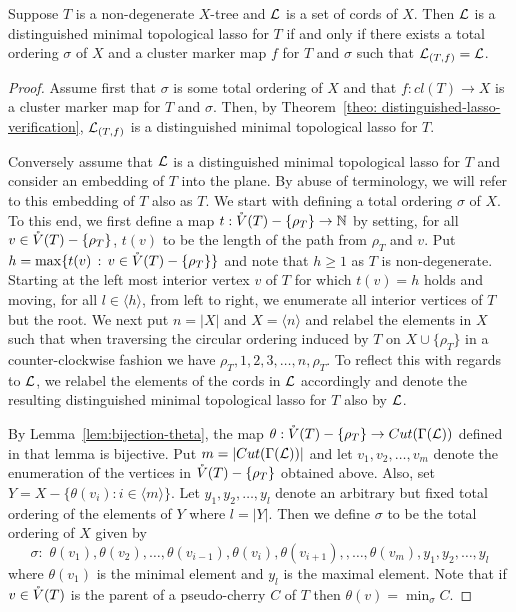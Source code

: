\begin{thm}\label{theo:characterization}
Suppose $T$ is a non-degenerate $X$-tree 
and ${\mathcal L}$ is a set of cords of $X$. Then 
${\mathcal L}$ is a distinguished minimal topological lasso
for $T$ if and only if there exists a total ordering $\sigma$ of $X$ and
a cluster marker map $f$ for $T$ and $\sigma$ 
such that ${\mathcal L}_{(T,f)}={\mathcal L}$.
\end{thm}
 \begin{proof}
Assume first that $\sigma$ is some total ordering of $X$ and that 
$f:cl(T)\to X$ is a cluster marker map for  $T$ and $\sigma$. Then, by
Theorem~\ref{theo: distinguished-lasso-verification}, ${\mathcal L}_{(T,f)}$
is a distinguished minimal topological lasso for $T$.

Conversely assume that ${\mathcal L}$ is a distinguished minimal topological lasso
for $T$ and consider an embedding of $T$ into the plane. 
By abuse of terminology,  we will refer to this embedding of $T$ also as $T$.
We start with defining a total ordering $\sigma$ of $X$.
To this end, we first define a map $t:\mathring{V}(T)-\{\rho_T\}\to \mathbb N$
by setting, for all $v\in \mathring{V}(T)-\{\rho_T\}$, 
 $t(v)$ to be the length of the path from
$\rho_T$ and $v$. Put $h=\max\{t(v)\,:\, v\in \mathring{V}(T)-\{\rho_T\}\}$ 
and note that $h\geq 1$ as $T$ is non-degenerate. 
Starting at the left most interior vertex $v$ of $T$ for which $t(v)=h$ 
holds and moving, for all $l \in \langle h\rangle$, from left to right, 
we enumerate
all interior vertices of $T$ but the root. We next put $n=|X|$ and
$X=\langle n\rangle$
and relabel the elements in $X$ such that when traversing the circular ordering
induced by $T$ on $X\cup\{\rho_T\}$ in a counter-clockwise fashion we have
$\rho_T,1,2,3,\ldots, n,\rho_T$. To reflect this with regards to
${\mathcal L}$, we relabel the elements of the
cords in ${\mathcal L}$ accordingly
and denote the resulting distinguished minimal topological lasso for
$T$ also by ${\mathcal L}$. 

By Lemma~\ref{lem:bijection-theta},
the map $\theta :\mathring{V}(T)-\{\rho_T\} \to Cut(\Gamma({\mathcal L}))$ 
defined in that lemma is bijective. Put $m=|Cut(\Gamma({\mathcal L}))|$ and
let $v_1,v_2,\ldots, v_m$ denote the enumeration of
the vertices in $\mathring{V}(T)-\{\rho_T\}$ obtained above. Also, 
set $Y=X-\{\theta(v_i): i\in \langle m\rangle\}$. Let 
 $y_1,y_2,\ldots, y_l$ denote an arbitrary but fixed total
 ordering of the elements 
of $Y$ where $l=|Y|$. Then we define $\sigma$ to be the total ordering of $X$
given by 
$$
\sigma:\,\, \theta(v_1),\theta(v_2),\ldots, \theta(v_{i-1}),
\theta(v_i),\theta(v_{i+1}),
,\ldots, \theta(v_m),y_1,y_2,\ldots, y_l
$$ 
where $\theta(v_1)$ is the minimal element and $y_l$ is the maximal element. 
Note that if $v\in \mathring{V}(T)$ is the 
parent of a pseudo-cherry $C$ of $T$ then $\theta(v)=\min_{\sigma}C$.



\end{proof}
